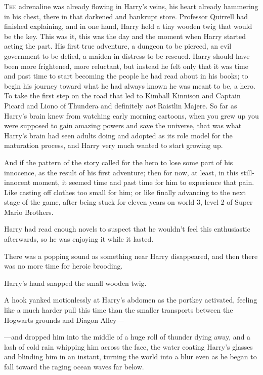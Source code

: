 
\lettrine{T}{he} adrenaline was already flowing in Harry's veins, his heart already hammering in his chest, there in that darkened and bankrupt store. Professor Quirrell had finished explaining, and in one hand, Harry held a tiny wooden twig that would be the key. This was it, this was the day and the moment when Harry started acting the part. His first true adventure, a dungeon to be pierced, an evil government to be defied, a maiden in distress to be rescued. Harry should have been more frightened, more reluctant, but instead he felt only that it was time and past time to start becoming the people he had read about in his books; to begin his journey toward what he had always known he was meant to be, a hero. To take the first step on the road that led to Kimball Kinnison and Captain Picard and Liono of Thundera and definitely \emph{not} Raistlin Majere. So far as Harry's brain knew from watching early morning cartoons, when you grew up you were supposed to gain amazing powers and save the universe, that was what Harry's brain had seen adults doing and adopted as its role model for the maturation process, and Harry very much wanted to start growing up.

And if the pattern of the story called for the hero to lose some part of his innocence, as the result of his first adventure; then for now, at least, in this still-innocent moment, it seemed time and past time for him to experience that pain. Like casting off clothes too small for him; or like finally advancing to the next stage of the game, after being stuck for eleven years on world 3, level 2 of Super Mario Brothers.

Harry had read enough novels to suspect that he wouldn't feel this enthusiastic afterwards, so he was enjoying it while it lasted.

There was a popping sound as something near Harry disappeared, and then there was no more time for heroic brooding.

Harry's hand snapped the small wooden twig.

A hook yanked motionlessly at Harry's abdomen as the portkey activated, feeling like a much harder pull this time than the smaller transports between the Hogwarts grounds and Diagon Alley—

—and dropped him into the middle of a huge roll of thunder dying away, and a lash of cold rain whipping him across the face, the water coating Harry's glasses and blinding him in an instant, turning the world into a blur even as he began to fall toward the raging ocean waves far below.

